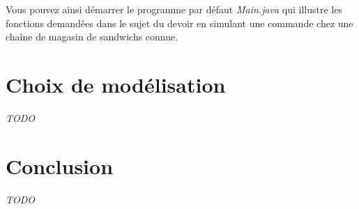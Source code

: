 \documentclass[a4paper]{article}
\begin{document}
  Vous pouvez ainsi démarrer le programme par défaut \emph{Main.java} qui illustre les fonctions demandées dans le sujet du devoir en simulant une commande chez une chaîne de magasin de sandwichs connue.


\section{Choix de modélisation}

\emph{TODO}


\section{Conclusion}

\emph{TODO}
\end{document}
